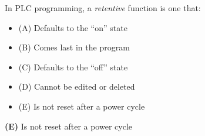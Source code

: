

In PLC programming, a {\it retentive} function is one that:

\begin{itemize}
\item{(A)} Defaults to the ``on'' state
\vskip 5pt 
\item{(B)} Comes last in the program
\vskip 5pt 
\item{(C)} Defaults to the ``off'' state
\vskip 5pt 
\item{(D)} Cannot be edited or deleted
\vskip 5pt 
\item{(E)} Is not reset after a power cycle
\end{itemize}







{\bf (E)} Is not reset after a power cycle
 










